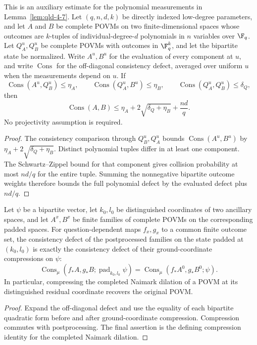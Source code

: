 \begin{theorem}
\label{thm:qld-polynomial-consistency-from-points}
\leanok
This is an auxiliary estimate for the polynomial measurements in
Lemma~\ref{lem:qld-4-7}. Let $(q,n,d,k)$ be directly indexed low-degree
parameters, and let $A$ and $B$ be complete POVMs on two finite-dimensional
spaces whose outcomes are $k$-tuples of individual-degree-$d$ polynomials in
$n$ variables over $\F_q$. Let $Q_A^u,Q_B^u$ be complete POVMs with outcomes
in $\F_q^k$, and let the bipartite state be normalized. Write $A^u,B^u$ for
the evaluation of every component at $u$, and write
$\operatorname{Cons}$ for the off-diagonal consistency defect, averaged over
uniform $u$ when the measurements depend on $u$. If
\[
\operatorname{Cons}(A^u,Q_B^u)\leq\eta_A,\qquad
\operatorname{Cons}(Q_A^u,B^u)\leq\eta_B,\qquad
\operatorname{Cons}(Q_A^u,Q_B^u)\leq\delta_Q,
\]
then
\[
\operatorname{Cons}(A,B)
\leq \eta_A+2\sqrt{\delta_Q+\eta_B}+\frac{nd}{q}.
\]
No projectivity assumption is required.
\end{theorem}
\begin{proof}
\leanok
The consistency comparison through $Q_B^u,Q_A^u$ bounds
$\operatorname{Cons}(A^u,B^u)$ by
$\eta_A+2\sqrt{\delta_Q+\eta_B}$. Distinct polynomial tuples differ in
at least one component. The Schwartz--Zippel bound for that component gives
collision probability at most $nd/q$ for the entire tuple. Summing the
nonnegative bipartite outcome weights therefore bounds the full polynomial
defect by the evaluated defect plus $nd/q$.
\end{proof}

\begin{theorem}
\label{thm:qld-ground-compression-postprocessing}
\leanok
{}
Let $\psi$ be a bipartite vector, let $k_0,l_0$ be distinguished coordinates
of two ancillary spaces, and let $A^x,B^x$ be finite families of complete POVMs
on the corresponding padded spaces. For question-dependent maps $f_x,g_x$ to
a common finite outcome set, the consistency defect of the postprocessed
families on the state padded at $(k_0,l_0)$ is exactly the consistency defect of
their ground-coordinate compressions on $\psi$:
\[
 \operatorname{Cons}_\mu(f_*A,g_*B;\operatorname{pad}_{k_0,l_0}\psi)
 =\operatorname{Cons}_\mu(f_*A^0,g_*B^0;\psi).
\]
In particular, compressing the completed Naimark dilation of a POVM at its
distinguished residual coordinate recovers the original POVM.
\end{theorem}
\begin{proof}
\leanok
{}
Expand the off-diagonal defect and use the equality of each bipartite quadratic
form before and after ground-coordinate compression. Compression commutes with
postprocessing. The final assertion is the defining compression identity for
the completed Naimark dilation.
\end{proof}


